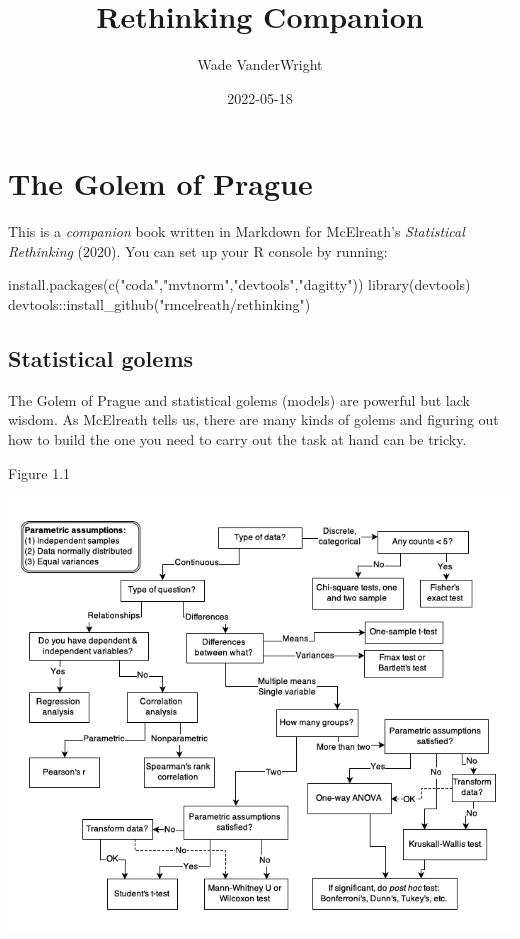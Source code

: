 \documentclass[
]{book}
\title{Rethinking Companion}
\author{Wade VanderWright}
\date{2022-05-18}
\newenvironment{Shaded}{\begin{snugshade}}{\end{snugshade}}
\newcommand{\FunctionTok}[1]{\textcolor[rgb]{0.00,0.00,0.00}{#1}}
\newcommand{\NormalTok}[1]{#1}
\newcommand{\SpecialCharTok}[1]{\textcolor[rgb]{0.00,0.00,0.00}{#1}}
\newcommand{\StringTok}[1]{\textcolor[rgb]{0.31,0.60,0.02}{#1}}
\theoremstyle{definition}
\theoremstyle{definition}
\theoremstyle{definition}
\theoremstyle{definition}
\theoremstyle{remark}
\begin{document}
\maketitle

{
\setcounter{tocdepth}{1}
\tableofcontents
}
\hypertarget{the-golem-of-prague}{%
\chapter{The Golem of Prague}\label{the-golem-of-prague}}

This is a \emph{companion} book written in Markdown for McElreath's \emph{Statistical Rethinking} (2020). You can set up your R console by running:

\begin{Shaded}
\begin{Highlighting}[]
\FunctionTok{install.packages}\NormalTok{(}\FunctionTok{c}\NormalTok{(}\StringTok{"coda"}\NormalTok{,}\StringTok{"mvtnorm"}\NormalTok{,}\StringTok{"devtools"}\NormalTok{,}\StringTok{"dagitty"}\NormalTok{))}
\FunctionTok{library}\NormalTok{(devtools)}
\NormalTok{devtools}\SpecialCharTok{::}\FunctionTok{install\_github}\NormalTok{(}\StringTok{"rmcelreath/rethinking"}\NormalTok{)}
\end{Highlighting}
\end{Shaded}

\hypertarget{statistical-golems}{%
\section{Statistical golems}\label{statistical-golems}}

The Golem of Prague and statistical golems (models) are powerful but lack wisdom. As McElreath tells us, there are many kinds of golems and figuring out how to build the one you need to carry out the task at hand can be tricky.

Figure 1.1

\includegraphics[width=9.89in]{./_images/fig1.1}
\end{document}
